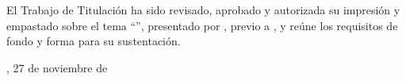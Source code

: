 
El Trabajo de Titulación ha sido revisado, aprobado y autorizada su impresión y empastado sobre el tema ``\UTITituloProyectoMayusculas'', presentado por \UTIAutoresTexto, previo a \UTIFraseObtencionTituloProfesional{}, y reúne los requisitos de fondo y forma para su sustentación.

\vspace{1.5cm}
{\raggedleft
\UTICiudadPais, 27 de noviembre de \UTIAnio\par}
\vspace{2.5cm}

\UTILectoresFirmaBloque
